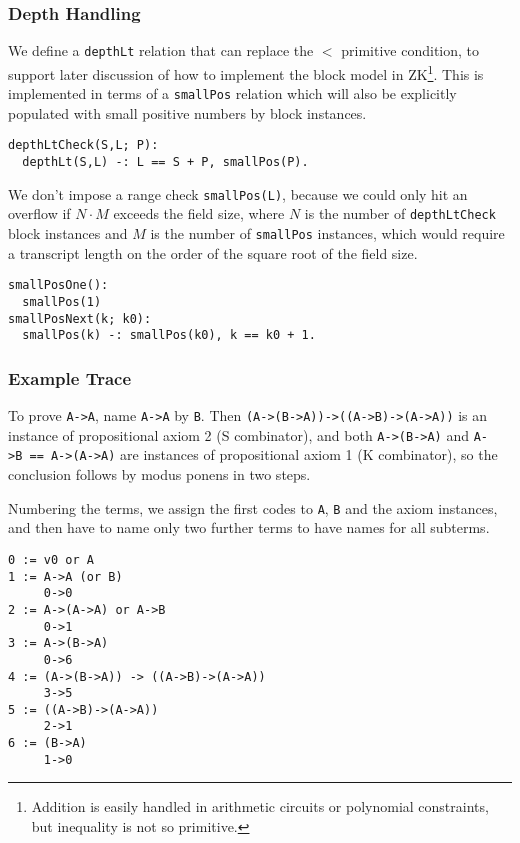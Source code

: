 \documentclass{article}
\theoremstyle{plain}
\theoremstyle{definition}
\begin{document}
\subsubsection{Depth Handling}\label{depth-handling}

We define a \texttt{depthLt} relation that can replace the $<$ primitive
condition, to support later discussion of how to implement the block model in ZK\footnote{Addition is easily handled in arithmetic circuits or polynomial constraints, but inequality is not so primitive.}.
This is implemented in terms of a \texttt{smallPos} relation which will
also be explicitly populated with small positive numbers by block instances.

\begin{verbatim}
depthLtCheck(S,L; P):
  depthLt(S,L) -: L == S + P, smallPos(P).
\end{verbatim}

We don't impose a range check \texttt{smallPos(L)}, because we could only
hit an overflow if $N\cdot M$ exceeds the field size, where $N$ is the
number of \texttt{depthLtCheck} block instances and $M$ is the number
of \texttt{smallPos} instances, which would require a transcript length on the order of the square root of the field size.

\begin{verbatim}
smallPosOne():
  smallPos(1)
smallPosNext(k; k0):
  smallPos(k) -: smallPos(k0), k == k0 + 1.
\end{verbatim}

\subsubsection{Example Trace}\label{example-trace}

To prove \texttt{A-\textgreater{}A}, name \texttt{A-\textgreater{}A} by
\texttt{B}.
Then \texttt{(A-\textgreater{}(B-\textgreater{}A))-\textgreater{}((A-\textgreater{}B)-\textgreater{}(A-\textgreater{}A))}
is an instance of propositional axiom 2 (S combinator), and
both \texttt{A-\textgreater{}(B-\textgreater{}A)} and
\texttt{A-\textgreater{}B\ ==\ A-\textgreater{}(A-\textgreater{}A)} are
instances of propositional axiom 1 (K combinator), 
so the conclusion follows by modus ponens in two steps.

Numbering the terms, we assign the first codes to \texttt{A},
\texttt{B} and the axiom instances, and then have to name only
two further terms to have names for all subterms.

\begin{verbatim}
0 := v0 or A
1 := A->A (or B)
     0->0
2 := A->(A->A) or A->B
     0->1
3 := A->(B->A)
     0->6
4 := (A->(B->A)) -> ((A->B)->(A->A))
     3->5
5 := ((A->B)->(A->A))
     2->1
6 := (B->A)
     1->0
\end{verbatim}
\end{document}
